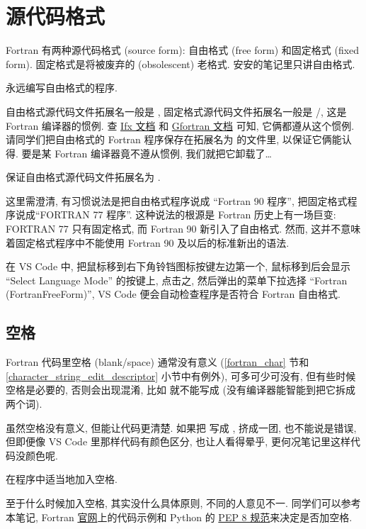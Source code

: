 \section{源代码格式}

Fortran 有两种源代码格式 (source form): 自由格式 (free form) 和固定格式 (fixed form). 固定格式是将被废弃的 (obsolescent) 老格式. 安安的笔记里只讲自由格式.
\begin{convention}
    永远编写自由格式的程序.
\end{convention}

自由格式源代码文件拓展名一般是 , 固定格式源代码文件拓展名一般是 /, 这是 Fortran 编译器的惯例. 查 \href{https://cdrdv2.intel.com/v1/dl/getContent/824360?fileName=fortran-compiler_developer-guide-reference_2024.2-767251-824360.pdf}{Ifx 文档} 和 \href{https://gcc.gnu.org/onlinedocs/gcc-13.2.0/gfortran.pdf}{Gfortran 文档} 可知, 它俩都遵从这个惯例. 请同学们把自由格式的 Fortran 程序保存在拓展名为  的文件里, 以保证它俩能认得. 要是某 Fortran 编译器竟不遵从惯例, 我们就把它卸载了\dots{}
\begin{convention}
    保证自由格式源代码文件拓展名为 .
\end{convention}

这里需澄清, 有习惯说法是把自由格式程序说成 ``Fortran 90 程序'', 把固定格式程序说成``FORTRAN 77 程序''. 这种说法的根源是 Fortran 历史上有一场巨变: FORTRAN 77 只有固定格式, 而 Fortran 90 新引入了自由格式. 然而, 这并不意味着固定格式程序中不能使用 Fortran 90 及以后的标准新出的语法.

在 VS Code 中, 把鼠标移到右下角铃铛图标按键左边第一个, 鼠标移到后会显示 ``Select Language Mode'' 的按键上, 点击之, 然后弹出的菜单下拉选择 ``Fortran (FortranFreeForm)'', VS Code 便会自动检查程序是否符合 Fortran 自由格式.

\subsection{空格}

Fortran 代码里空格 (blank/space) 通常没有意义 (\ref{fortran_char} 节和 \ref{character_string_edit_descriptor} 小节中有例外), 可多可少可没有, 但有些时候空格是必要的, 否则会出现混淆, 比如  就不能写成  (没有编译器能智能到把它拆成两个词).

虽然空格没有意义, 但能让代码更清楚. 如果把  写成 , 挤成一团, 也不能说是错误, 但即便像 VS Code 里那样代码有颜色区分, 也让人看得晕乎, 更何况笔记里这样代码没颜色呢.
\begin{convention}
    在程序中适当地加入空格.\label{fortran_blank}
\end{convention}
至于什么时候加入空格, 其实没什么具体原则, 不同的人意见不一. 同学们可以参考本笔记,  Fortran \href{https://fortran-lang.org/}{官网}上的代码示例和 Python 的 \href{https://peps.python.org/pep-0008/}{PEP 8 规范}来决定是否加空格.


